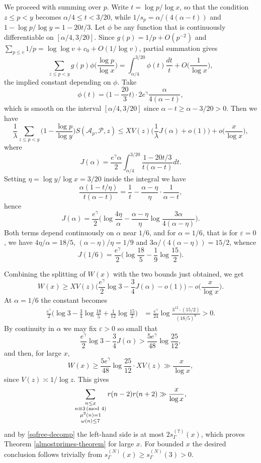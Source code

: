 \documentclass[12pt]{amsart}
\theoremstyle{remark}
\renewcommand{\pmod}[1]{\mkern3mu(\mathrm{mod}\ #1)}
\begin{document}
We proceed with summing over $p$.
Write $t = \log p/\log x$, so that the condition $z \le p< y$ becomes $\alpha/4 \le t < 3/20$, while $1/s_p = \alpha/(4(\alpha-t))$ and $1-\log p/\log y=1-20t/3$. 
Let $\phi$ be any function that is continuously differentiable on $[\alpha/4,3/20]$. 
Since $g(p)=1/p+O(p^{-2})$ and $\sum_{p\le v}1/p=\log\log v+c_0+O(1/\log v)$, partial summation gives
\[
    \sum_{z \le p < y}g(p) \phi \biggl(\frac{\log p}{\log x}\biggr) = \int_{\alpha/4}^{3/20} \phi(t)\frac{dt}{t} + O\biggl(\frac{1}{\log x}\biggr),
\]
the implied constant depending on $\phi$.
Take 
\[
    \phi(t) = \biggl(1-\frac{20}{3}t\biggr) \cdot 2e^\gamma\frac{\alpha}{4(\alpha-t)},
\]
which is smooth on the interval $[\alpha/4,3/20]$ since $\alpha-t \ge \alpha - 3/20 > 0$.
Then we have
\[
    \frac{1}{\lambda} \sum_{z \le p < y}\biggl(1-\frac{\log p}{\log y}\biggr) S(\mathcal A_p,\mathcal P,z)\le XV(z)\biggl(\frac{1}{\lambda}J(\alpha)+o(1)\biggr)+o\biggl(\frac{x}{\log x}\biggr),
\]
where
\[
    J(\alpha) = \frac{e^\gamma\alpha}{2}\int_{\alpha/4}^{3/20}\frac{1-20t/3}{t(\alpha-t)}dt.
\]
Setting $\eta = \log y / \log x = 3/20$ inside the integral we have 
\[
    \frac{\alpha(1-t/\eta)}{t(\alpha-t)} = \frac{1}{t} - \frac{\alpha-\eta}{\eta}\cdot\frac{1}{\alpha-t},
\]
hence
\[
    J(\alpha) = \frac{e^\gamma}{2}\biggl(\log\frac{4\eta}{\alpha}-\frac{\alpha-\eta}{\eta}\log\frac{3\alpha}{4(\alpha-\eta)}\biggr).
\]
Both terms depend continuously on $\alpha$ near $1/6$, and for $\alpha=1/6$, that is for $\varepsilon=0$, we have $4\eta/\alpha=18/5$, $(\alpha-\eta)/\eta=1/9$ and $3\alpha/(4(\alpha-\eta))=15/2$, whence
\[
    J(1/6) = \frac{e^\gamma}{2}\biggl(\log\frac{18}{5}-\frac19\log\frac{15}{2}\biggr).
\]

Combining the splitting of $W(x)$ with the two bounds just obtained, we get
\[
    W(x) \ge XV(z)\biggl(\frac{e^\gamma}{2}\log3-\frac34J(\alpha)-o(1)\biggr)-o\biggl(\frac{x}{\log x}\biggr).
\]
At $\alpha=1/6$ the constant becomes
\[
    \begin{split}
        \frac{e^\gamma}{2}\biggl(\log 3-\frac{3}{4} \log\frac{18}{5}+\frac{1}{12}\log\frac{15}{2}\biggr)
        &=\frac{e^\gamma}{24}\log\frac{3^{12}\cdot(15/2)}{(18/5)^9} > 0.
    \end{split}
\]
By continuity in $\alpha$ we may fix $\varepsilon > 0$ so small that
\[
    \frac{e^\gamma}{2}\log3-\frac34J(\alpha)>\frac{5e^\gamma}{48}\log\frac{25}{12},
\]
and then, for large $x$,
\[
    W(x) \ge\frac{5e^\gamma}{48}\log\frac{25}{12}\cdot XV(z) \gg \frac{x}{\log x},
\]
since $V(z)\asymp 1/\log z$.
This gives
\[
    \sum_{\substack{n\le x \\ n\equiv 3\pmod 4\\ \mu^2(n) = 1 \\ \omega(n) \le 7}} r(n-2)r(n+2) \gg \frac{x}{\log x},
\]
and by \eqref{sqfree-decomp} the left-hand side is at most $2s_{\Gamma}^{(7)}(x)$, which proves Theorem \ref{almostprimes-theorem} for large $x$. 
For bounded $x$ the desired conclusion follows trivially from $s^{(N)}_{\Gamma}(x) \ge s^{(N)}_{\Gamma}(3) > 0$.
\end{document}
